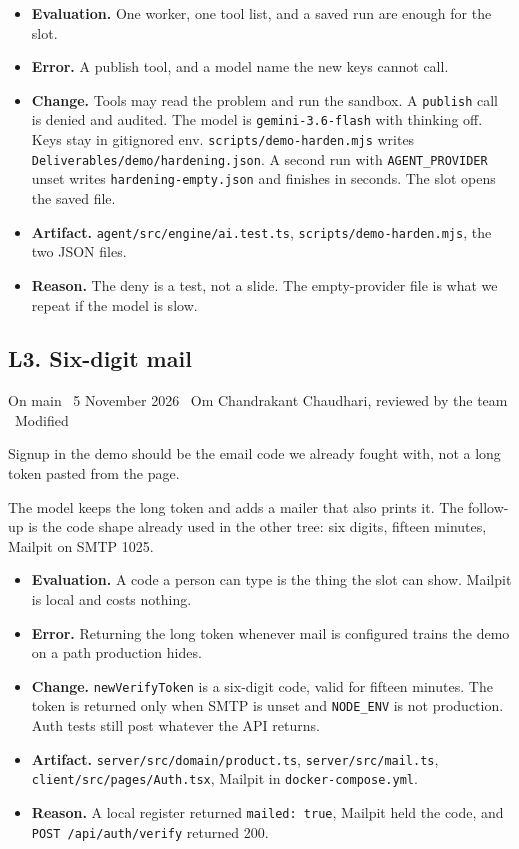 \documentclass[11pt,a4paper]{article}
\newcommand{\meta}[1]{{\small #1}\par}
\newcommand{\step}[1]{\par\vspace{0.15em}{\bfseries #1}\par\vspace{-0.15em}}
\begin{document}
\step{3. Decision}
\begin{itemize}
\item \textbf{Evaluation.} One worker, one tool list, and a saved run are enough for the slot.
\item \textbf{Error.} A publish tool, and a model name the new keys cannot call.
\item \textbf{Change.} Tools may read the problem and run the sandbox. A \texttt{publish} call is denied and audited. The model is \texttt{gemini-3.6-flash} with thinking off. Keys stay in gitignored env. \texttt{scripts/demo-harden.mjs} writes \texttt{Deliverables/demo/hardening.json}. A second run with \texttt{AGENT\_PROVIDER} unset writes \texttt{hardening-empty.json} and finishes in seconds. The slot opens the saved file.
\item \textbf{Artifact.} \texttt{agent/src/engine/ai.test.ts}, \texttt{scripts/demo-harden.mjs}, the two JSON files.
\item \textbf{Reason.} The deny is a test, not a slide. The empty-provider file is what we repeat if the model is slow.
\end{itemize}

\subsection{L3. Six-digit mail}
\meta{On main \textperiodcentered\ 5 November 2026 \textperiodcentered\ Om Chandrakant Chaudhari, reviewed by the team \textperiodcentered\ Modified}

\step{1. Prompt}
Signup in the demo should be the email code we already fought with, not a long token pasted from the page.

\step{2. Reply (summarised)}
The model keeps the long token and adds a mailer that also prints it. The follow-up is the code shape already used in the other tree: six digits, fifteen minutes, Mailpit on SMTP 1025.

\step{3. Decision}
\begin{itemize}
\item \textbf{Evaluation.} A code a person can type is the thing the slot can show. Mailpit is local and costs nothing.
\item \textbf{Error.} Returning the long token whenever mail is configured trains the demo on a path production hides.
\item \textbf{Change.} \texttt{newVerifyToken} is a six-digit code, valid for fifteen minutes. The token is returned only when SMTP is unset and \texttt{NODE\_ENV} is not production. Auth tests still post whatever the API returns.
\item \textbf{Artifact.} \texttt{server/src/domain/product.ts}, \texttt{server/src/mail.ts}, \texttt{client/src/pages/Auth.tsx}, Mailpit in \texttt{docker-compose.yml}.
\item \textbf{Reason.} A local register returned \texttt{mailed: true}, Mailpit held the code, and \texttt{POST /api/auth/verify} returned 200.
\end{itemize}
\end{document}
